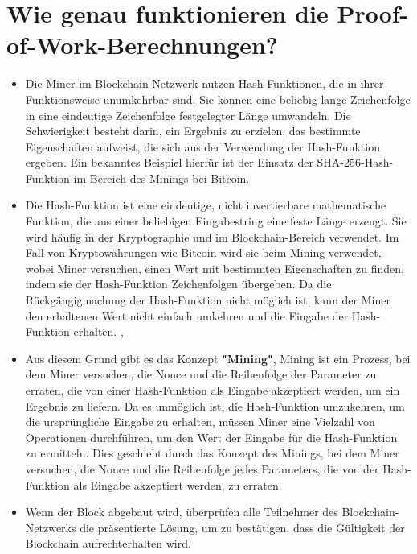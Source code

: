 \documentclass[ngerman]{scrreprt}
\begin{document}
\section{Wie genau funktionieren die Proof-of-Work-Berechnungen?}
\begin{itemize}
	\item {Die Miner im Blockchain-Netzwerk nutzen Hash-Funktionen, die in ihrer Funktionsweise unumkehrbar sind. Sie können eine beliebig lange Zeichenfolge in eine eindeutige Zeichenfolge festgelegter Länge umwandeln. Die Schwierigkeit besteht darin, ein Ergebnis zu erzielen, das bestimmte Eigenschaften aufweist, die sich aus der Verwendung der Hash-Funktion ergeben. Ein bekanntes Beispiel hierfür ist der Einsatz der SHA-256-Hash-Funktion im Bereich des Minings bei Bitcoin. \cite{btc-echo-proof-of-work}}
	\item{Die Hash-Funktion ist eine eindeutige, nicht invertierbare mathematische Funktion, die aus einer beliebigen Eingabestring eine feste Länge erzeugt. Sie wird häufig in der Kryptographie und im Blockchain-Bereich verwendet. Im Fall von Kryptowährungen wie Bitcoin wird sie beim Mining verwendet, wobei Miner versuchen, einen Wert mit bestimmten Eigenschaften zu finden, indem sie der Hash-Funktion Zeichenfolgen übergeben. Da die Rückgängigmachung der Hash-Funktion nicht möglich ist, kann der Miner den erhaltenen Wert nicht einfach umkehren und die Eingabe der Hash-Funktion erhalten.} \cite{fool}, \cite{btc-echo-proof-of-work}
	\item{Aus diesem Grund gibt es das Konzept \textbf{"Mining"}, Mining ist ein Prozess, bei dem Miner versuchen, die Nonce und die Reihenfolge der Parameter zu erraten, die von einer Hash-Funktion als Eingabe akzeptiert werden, um ein Ergebnis zu liefern. Da es unmöglich ist, die Hash-Funktion umzukehren, um die ursprüngliche Eingabe zu erhalten, müssen Miner eine Vielzahl von Operationen durchführen, um den Wert der Eingabe für die Hash-Funktion zu ermitteln. Dies geschieht durch das Konzept des Minings, bei dem Miner versuchen, die Nonce und die Reihenfolge jedes Parameters, die von der Hash-Funktion als Eingabe akzeptiert werden, zu erraten.}
	\item{Wenn der Block abgebaut wird, überprüfen alle Teilnehmer des Blockchain-Netzwerks die präsentierte Lösung, um zu bestätigen, dass die Gültigkeit der Blockchain aufrechterhalten wird.} \cite{btc-echo-proof-of-work} 
\end{itemize}
\end{document}
